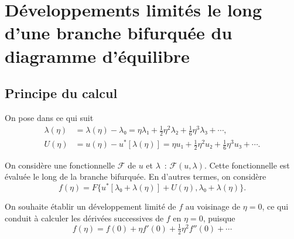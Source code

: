 \documentclass[12pt, final]{amsart}
\theoremstyle{definition}
\begin{document}
\section{Développements limités le long d'une branche bifurquée du diagramme d'équilibre}

\subsection{Principe du calcul}
\label{sec:20220107121442}

On pose dans ce qui suit
\begin{align}
  \label{eq:20211112155446}
  λ(η) & = λ(η) - λ₀ = η λ₁ + \tfrac{1}{2} η^2 λ₂ + \tfrac{1}{6} η^3 λ₃ + \cdots,\\
 \label{eq:20211112113028}
  U(η) & = u(η) - u^{\ast}[λ(η)] = η u₁ + \tfrac{1}{2} η^2 u₂ + \tfrac{1}{6} η^3 u₃ + \cdots.
\end{align}

On considère une fonctionnelle \(\mathcal{F}\) de \(u\) et \(λ\)~:
\(\mathcal{F}(u, λ)\). Cette fonctionnelle est évaluée le long de la branche
bifurquée. En d'autres termes, on considère
\begin{equation}
  f(η) = F\{ u^{\ast} [λ₀ + λ(η)] + U(η), λ₀ + λ(η) \}.
\end{equation}

On souhaite établir un développement limité de \(f\) au voisinage de \(η = 0\),
ce qui conduit à calculer les dérivées successives de \(f\) en \(η = 0\),
puisque
\begin{equation}
  f(η) = f(0) + η f'(0) + \tfrac{1}{2} η^2 f''(0) + \cdots
\end{equation}
\end{document}
